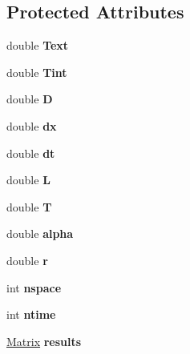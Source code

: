 \subsection*{Protected Attributes}
\begin{DoxyCompactItemize}
\item 
\mbox{\label{class_p_d_e_solve_ae90f30578b9f059185d4553efe663021}} 
double {\bfseries Text}
\item 
\mbox{\label{class_p_d_e_solve_aa96724f2704b587422cca5db7a488a91}} 
double {\bfseries Tint}
\item 
\mbox{\label{class_p_d_e_solve_a29e1840d3920895a799f8fc9cc750100}} 
double {\bfseries D}
\item 
\mbox{\label{class_p_d_e_solve_a837a7184ab181018e2e50144dfd37621}} 
double {\bfseries dx}
\item 
\mbox{\label{class_p_d_e_solve_a998c79622e229397bc988a98b730a8f8}} 
double {\bfseries dt}
\item 
\mbox{\label{class_p_d_e_solve_a3d1cc5eb7d044c7d1ac3a63186c9568b}} 
double {\bfseries L}
\item 
\mbox{\label{class_p_d_e_solve_a6b1115026865cec58e0df85c1cdfae53}} 
double {\bfseries T}
\item 
\mbox{\label{class_p_d_e_solve_aae3469330310d592e1985e60c94c9ffc}} 
double {\bfseries alpha}
\item 
\mbox{\label{class_p_d_e_solve_aa05249ea5bc3b88ba31ba55cc1001430}} 
double {\bfseries r}
\item 
\mbox{\label{class_p_d_e_solve_a43a38979eace61277158603f627aff37}} 
int {\bfseries nspace}
\item 
\mbox{\label{class_p_d_e_solve_ab35ddaf48c1881a7aa3f01dbbaf0445f}} 
int {\bfseries ntime}
\item 
\mbox{\label{class_p_d_e_solve_a054590e2a2423ed31cc2cc9c23620701}} 
\hyperlink{class_matrix}{Matrix} {\bfseries results}
\end{DoxyCompactItemize}


